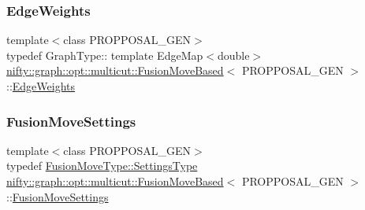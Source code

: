 \mbox{\label{classnifty_1_1graph_1_1opt_1_1multicut_1_1FusionMoveBased_a5bc1f4904c2506a452119f800c570f21}} 
\subsubsection{\texorpdfstring{Edge\+Weights}{EdgeWeights}}
{\footnotesize\ttfamily template$<$class P\+R\+O\+P\+P\+O\+S\+A\+L\+\_\+\+G\+EN$>$ \\
typedef Graph\+Type\+:: template Edge\+Map$<$double$>$ \hyperlink{classnifty_1_1graph_1_1opt_1_1multicut_1_1FusionMoveBased}{nifty\+::graph\+::opt\+::multicut\+::\+Fusion\+Move\+Based}$<$ P\+R\+O\+P\+P\+O\+S\+A\+L\+\_\+\+G\+EN $>$\+::\hyperlink{classnifty_1_1graph_1_1opt_1_1multicut_1_1FusionMoveBased_a5bc1f4904c2506a452119f800c570f21}{Edge\+Weights}}

\mbox{\label{classnifty_1_1graph_1_1opt_1_1multicut_1_1FusionMoveBased_aaa8805d6f7e74144a52a6b35b1e40fcc}} 
\subsubsection{\texorpdfstring{Fusion\+Move\+Settings}{FusionMoveSettings}}
{\footnotesize\ttfamily template$<$class P\+R\+O\+P\+P\+O\+S\+A\+L\+\_\+\+G\+EN$>$ \\
typedef \hyperlink{structnifty_1_1graph_1_1opt_1_1multicut_1_1FusionMove_1_1SettingsType}{Fusion\+Move\+Type\+::\+Settings\+Type} \hyperlink{classnifty_1_1graph_1_1opt_1_1multicut_1_1FusionMoveBased}{nifty\+::graph\+::opt\+::multicut\+::\+Fusion\+Move\+Based}$<$ P\+R\+O\+P\+P\+O\+S\+A\+L\+\_\+\+G\+EN $>$\+::\hyperlink{classnifty_1_1graph_1_1opt_1_1multicut_1_1FusionMoveBased_aaa8805d6f7e74144a52a6b35b1e40fcc}{Fusion\+Move\+Settings}}

